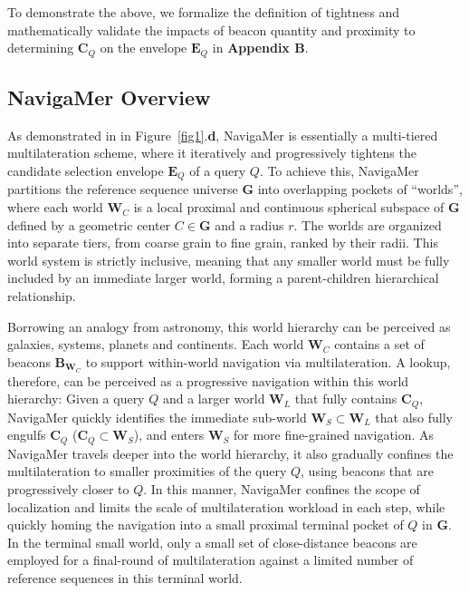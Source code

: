\documentclass[unnumsec,webpdf,contemporary,large]{oup-authoring-template}%
\theoremstyle{thmstyleone}%
\theoremstyle{thmstyletwo}%
\theoremstyle{thmstylethree}%
\begin{document}
To demonstrate the above, we formalize the definition of tightness and mathematically validate the impacts of beacon quantity and proximity to determining $\mathbf{C}_Q$ on the envelope $\textbf{E}_Q$ in \textbf{Appendix B}.


\subsection{NavigaMer Overview}

As demonstrated in in Figure~\ref{fig1}.\textbf{d}, NavigaMer is essentially a multi-tiered multilateration scheme, where it iteratively and progressively tightens the candidate selection envelope $\textbf{E}_Q$ of a query $Q$.
To achieve this, NavigaMer partitions the reference sequence universe $\textbf{G}$ into overlapping pockets of ``worlds'',
where each world $\textbf{W}_C$ is a local proximal and continuous spherical subspace of $\textbf{G}$ defined by a geometric center $C \in \textbf{G}$ and a radius $r$.
The worlds are organized into separate tiers, from coarse grain to fine grain, ranked by their radii.
This world system is strictly inclusive, meaning that any smaller world must be fully included by an immediate larger world, forming a parent-children hierarchical relationship.

Borrowing an analogy from astronomy, this world hierarchy can be perceived as galaxies, systems, planets and continents.
Each world $\textbf{W}_C$ contains a set of beacons $\textbf{B}_{\textbf{W}_C}$ to support within-world navigation via multilateration.
A lookup, therefore, can be perceived as a progressive navigation within this world hierarchy:
Given a query $Q$ and a larger world $\textbf{W}_L$ that fully contains $\textbf{C}_Q$,
NavigaMer quickly identifies the immediate sub-world $\textbf{W}_S \subset \textbf{W}_L$ that also fully engulfs $\textbf{C}_Q$ ($\textbf{C}_Q \subset \textbf{W}_S$), and enters $\textbf{W}_S$ for more fine-grained navigation.
As NavigaMer travels deeper into the world hierarchy, it also gradually confines the multilateration to smaller proximities of the query $Q$,
using beacons that are progressively closer to $Q$.
In this manner, NavigaMer confines the scope of localization and limits the scale of multilateration workload in each step,
while quickly homing the navigation into a small proximal terminal pocket of $Q$ in $\textbf{G}$.
In the terminal small world, only a small set of close-distance beacons are employed for a final-round of multilateration against a limited number of reference sequences in this terminal world.
\end{document}
